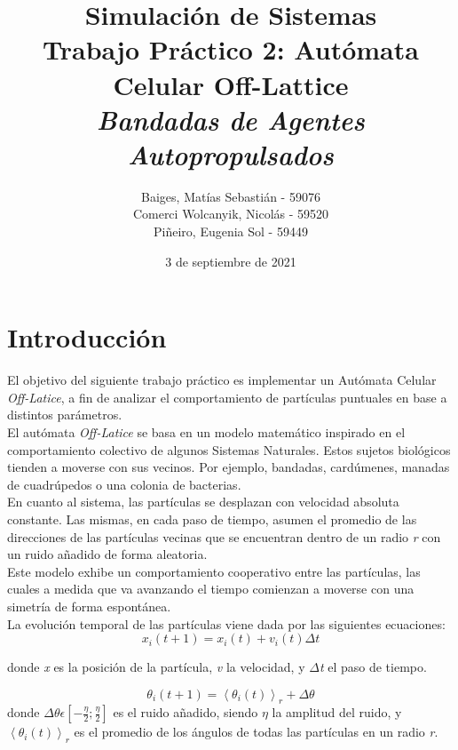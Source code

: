 \documentclass[12pt, a4paper]{report}
\title{%
\textbf{Simulación de Sistemas}\\
Trabajo Práctico 2: Autómata Celular Off-Lattice \\
\large \emph{Bandadas de Agentes Autopropulsados}
}
\author{Baiges, Matías Sebastián - 59076\\
Comerci Wolcanyik, Nicolás - 59520\\
Piñeiro, Eugenia Sol - 59449
}
\date{3 de septiembre de 2021}
\begin{document}
\maketitle

\tableofcontents
\newpage

\section{Introducción}
El objetivo del siguiente trabajo práctico es implementar un Autómata Celular \emph{Off-Latice}, 
a fin de analizar el comportamiento de partículas puntuales en base a distintos parámetros.\\

El autómata \emph{Off-Latice} se basa en un modelo matemático inspirado en el comportamiento colectivo de algunos Sistemas Naturales. Estos sujetos biológicos tienden a moverse con sus vecinos. Por ejemplo, bandadas, cardúmenes, manadas de cuadrúpedos o una colonia de bacterias.\cite{vicsek1995novel}\\

En cuanto al sistema, las partículas se desplazan con velocidad absoluta constante. Las mismas, en cada paso de tiempo, asumen el promedio de las direcciones de las partículas vecinas que se encuentran dentro de un radio \emph{r} con un ruido añadido de forma aleatoria.\\

Este modelo exhibe un comportamiento cooperativo entre las partículas, las cuales a medida que va avanzando el tiempo comienzan a moverse con una simetría de forma espontánea.\\ 

La evolución temporal de las partículas viene dada por las siguientes ecuaciones: 
\begin{equation}
\label{eq:velocity}
x_i(t+1) = x_i(t) + v_i(t) \Delta t 
\end{equation}

donde \emph{x} es la posición de la partícula, \emph{v} la velocidad, y $\Delta$\emph{t} el paso de tiempo.  

\begin{equation}
\label{eq:angle}
\theta _i(t+1) = \left\langle \theta _i(t)\right\rangle _r + \Delta \theta 
\end{equation}
donde $\Delta \theta  \epsilon  [-\frac{\eta}{2}; \frac{\eta}{2}]$ es el ruido añadido, siendo $\eta$ la amplitud del ruido, y \emph{$\left\langle \theta _i(t)\right\rangle _r$} es el promedio de los ángulos de todas las partículas en un radio \emph{r}.
\end{document}
